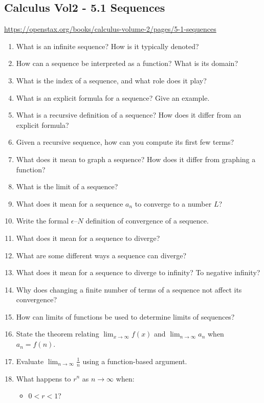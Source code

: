 \subsection{Calculus Vol2 - 5.1 Sequences}

\url{https://openstax.org/books/calculus-volume-2/pages/5-1-sequences}

\begin{enumerate}
  \item What is an infinite sequence? How is it typically denoted?
  \item How can a sequence be interpreted as a function? What is its domain?
  \item What is the index of a sequence, and what role does it play?
  \item What is an explicit formula for a sequence? Give an example.
  \item What is a recursive definition of a sequence? How does it differ from an explicit formula?
  \item Given a recursive sequence, how can you compute its first few terms?
  \item What does it mean to graph a sequence? How does it differ from graphing a function?
  \item What is the limit of a sequence?
  \item What does it mean for a sequence ${a_n}$ to converge to a number $L$?
  \item Write the formal $\epsilon$–$N$ definition of convergence of a sequence.
  \item What does it mean for a sequence to diverge?
  \item What are some different ways a sequence can diverge?
  \item What does it mean for a sequence to diverge to infinity? To negative infinity?
  \item Why does changing a finite number of terms of a sequence not affect its convergence?
  \item How can limits of functions be used to determine limits of sequences?
  \item State the theorem relating $\lim_{x\to\infty} f(x)$ and $\lim_{n\to\infty} a_n$ when $a_n = f(n)$.
  \item Evaluate $\lim_{n\to\infty} \frac{1}{n}$ using a function-based argument.
  \item What happens to $r^n$ as $n \to \infty$ when:
    \begin{itemize}
      \item $0 < r < 1$?

\end{itemize}
\end{enumerate}
